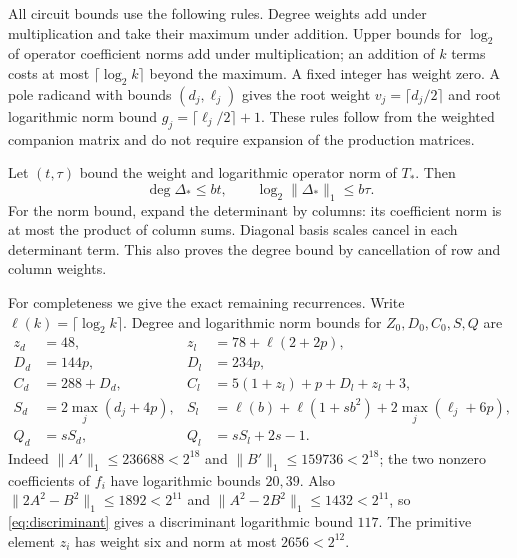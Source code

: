 \documentclass[11pt,a4paper]{article}
\theoremstyle{remark}\newtheorem{remark}[theorem]{Remark}
\begin{document}
All circuit bounds use the following rules. Degree weights add under
multiplication and take their maximum under addition. Upper bounds for
$\log_2$ of operator coefficient norms add under multiplication; an
addition of $k$ terms costs at most $\lceil\log_2 k\rceil$ beyond
the maximum. A fixed integer has weight zero. A pole radicand with
bounds $(d_j,\ell_j)$ gives the root weight
$v_j=\lceil d_j/2\rceil$ and root logarithmic norm bound
$g_j=\lceil\ell_j/2\rceil+1$. These rules follow from the weighted
companion matrix and do not require expansion of the production matrices.

Let $(t,\tau)$ bound the weight and logarithmic operator norm of $T_*$.
Then
\[
 \deg\Delta_*\le bt,\qquad \log_2\|\Delta_*\|_1\le b\tau.
\]
For the norm bound, expand the determinant by columns: its coefficient
norm is at most the product of column sums. Diagonal basis scales cancel
in each determinant term. This also proves the degree bound by cancellation
of row and column weights.

For completeness we give the exact remaining recurrences. Write
$\ell(k)=\lceil\log_2k\rceil$. Degree and logarithmic norm bounds for
$Z_0,D_0,C_0,S,Q$ are
\begin{align*}
 z_d&=48,& z_l&=78+\ell(2+2p),\\
 D_d&=144p,& D_l&=234p,\\
 C_d&=288+D_d,&C_l&=5(1+z_l)+p+D_l+z_l+3,\\
 S_d&=2\max_j(d_j+4p),&S_l&=\ell(b)+\ell(1+sb^2)+2\max_j(\ell_j+6p),\\
 Q_d&=sS_d,&Q_l&=sS_l+2s-1.
\end{align*}
Indeed $\|A'\|_1\le236688<2^{18}$ and
$\|B'\|_1\le159736<2^{18}$; the two nonzero coefficients of $f_i$
have logarithmic bounds $20,39$. Also
$\|2A^2-B^2\|_1\le1892<2^{11}$ and
$\|A^2-2B^2\|_1\le1432<2^{11}$, so \eqref{eq:discriminant}
gives a discriminant logarithmic bound $117$. The primitive element
$z_i$ has weight six and norm at most $2656<2^{12}$.
\end{document}
